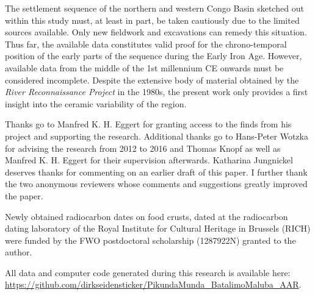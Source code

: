 \documentclass[smallextended,natbib]{svjour3}       %
\begin{document}
The settlement sequence of the northern and western Congo Basin sketched out within this study must, at least in part, be taken cautiously due to the limited sources available. Only new fieldwork and excavations can remedy this situation. Thus far, the available data constitutes valid proof for the chrono-temporal position of the early parts of the sequence during the Early Iron Age. However, available data from the middle of the 1st millennium CE onwards must be considered incomplete. Despite the extensive body of material obtained by the \textit{River Reconnaissance Project} in the 1980s, the present work only provides a first insight into the ceramic variability of the region.

\begin{acknowledgements}
Thanks go to Manfred K. H. Eggert for granting access to the finds from his project and supporting the research. Additional thanks go to Hans-Peter Wotzka for advising the research from 2012 to 2016 and Thomas Knopf as well as Manfred K. H. Eggert for their supervision afterwards. Katharina Jungnickel deserves thanks for commenting on an earlier draft of this paper. I further thank the two anonymous reviewers whose comments and suggestions greatly improved the paper.

Newly obtained radiocarbon dates on food crusts, dated at the radiocarbon dating laboratory of the Royal Institute for Cultural Heritage in Brussels (RICH) were funded by the FWO postdoctoral scholarship (1287922N) granted to the author.

All data and computer code generated during this research is available here: \url{https://github.com/dirkseidensticker/PikundaMunda_BatalimoMaluba_AAR}.
\end{acknowledgements}



\end{document}

